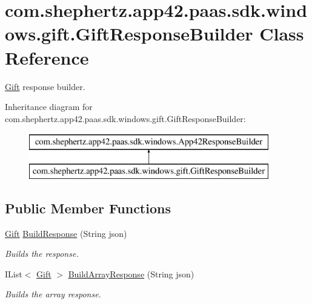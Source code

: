 \hypertarget{classcom_1_1shephertz_1_1app42_1_1paas_1_1sdk_1_1windows_1_1gift_1_1_gift_response_builder}{\section{com.\+shephertz.\+app42.\+paas.\+sdk.\+windows.\+gift.\+Gift\+Response\+Builder Class Reference}
\label{classcom_1_1shephertz_1_1app42_1_1paas_1_1sdk_1_1windows_1_1gift_1_1_gift_response_builder}
}


\hyperlink{classcom_1_1shephertz_1_1app42_1_1paas_1_1sdk_1_1windows_1_1gift_1_1_gift}{Gift} response builder.  


Inheritance diagram for com.\+shephertz.\+app42.\+paas.\+sdk.\+windows.\+gift.\+Gift\+Response\+Builder\+:\begin{figure}[H]
\begin{center}
\leavevmode
\includegraphics[height=2.000000cm]{classcom_1_1shephertz_1_1app42_1_1paas_1_1sdk_1_1windows_1_1gift_1_1_gift_response_builder}
\end{center}
\end{figure}
\subsection*{Public Member Functions}
\begin{DoxyCompactItemize}
\item 
\hyperlink{classcom_1_1shephertz_1_1app42_1_1paas_1_1sdk_1_1windows_1_1gift_1_1_gift}{Gift} \hyperlink{classcom_1_1shephertz_1_1app42_1_1paas_1_1sdk_1_1windows_1_1gift_1_1_gift_response_builder_a55aa4f114f389dea98fe73b8fd55c2ae}{Build\+Response} (String json)
\begin{DoxyCompactList}\small\item\em Builds the response. \end{DoxyCompactList}\item 
I\+List$<$ \hyperlink{classcom_1_1shephertz_1_1app42_1_1paas_1_1sdk_1_1windows_1_1gift_1_1_gift}{Gift} $>$ \hyperlink{classcom_1_1shephertz_1_1app42_1_1paas_1_1sdk_1_1windows_1_1gift_1_1_gift_response_builder_a78c473ca11117f110187a4833018d4eb}{Build\+Array\+Response} (String json)
\begin{DoxyCompactList}\small\item\em Builds the array response. \end{DoxyCompactList}\end{DoxyCompactItemize}


